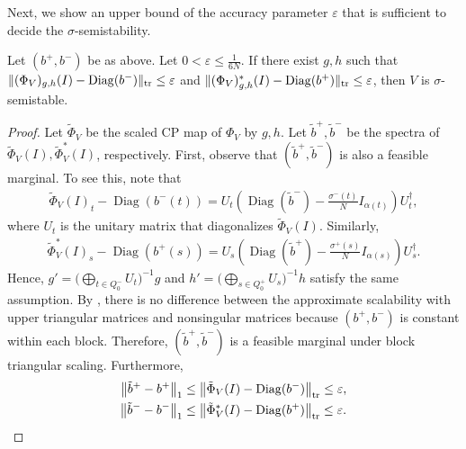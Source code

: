 \documentclass[a4paper,11pt]{article}
\numberwithin{equation}{section}
\newcommand{\eps}{\varepsilon}
\DeclareMathOperator{\tr}{tr}
\DeclareMathOperator{\Diag}{Diag}
\DeclarePairedDelimiter{\norm}{\lVert}{\rVert}
\begin{document}
Next, we show an upper bound of the accuracy parameter $\eps$ that is sufficient to decide the $\sigma$-semistability.

\begin{lemma}\label{lem:scaling-ss-eps}
    Let $(b^+, b^-)$ be as above.
    Let 
    $
    0 < \eps \leq \frac{1}{6N}.
    $
    If there exist $g, h$ such that $\norm{(\Phi_V)_{g,h}(I) - \Diag(b^-)}_{\tr} \leq \eps$ and $\norm{(\Phi_V)_{g,h}^*(I) - \Diag(b^+)}_{\tr} \leq \eps$, then $V$ is $\sigma$-semistable.
\end{lemma}
\begin{proof}
    Let $\tilde \Phi_V$ be the scaled CP map of $\Phi_V$ by $g, h$.
    Let $\tilde b^+, \tilde b^-$ be the spectra of $\tilde \Phi_V(I), \tilde \Phi_V^*(I)$, respectively.
    First, observe that $(\tilde b^+, \tilde b^-)$ is also a feasible marginal.
    To see this, note that
    \begin{align}
        \tilde\Phi_V(I)_t - \Diag(b^-(t)) = U_t \left(\Diag(\tilde b^-) - \frac{\sigma^-(t)}{N} I_{\alpha(t)}\right) U_t^\dagger, 
    \end{align}
    where $U_t$ is the unitary matrix that diagonalizes $\tilde \Phi_V(I)$.
    Similarly, 
    \begin{align}
        \tilde\Phi_V^*(I)_s - \Diag(b^+(s)) = U_s\left(\Diag(\tilde b^+) - \frac{\sigma^+(s)}{N} I_{\alpha(s)}\right) U_s^\dagger. 
    \end{align}
    Hence, $g' = {\bigl(\bigoplus_{t \in Q_0^-} U_t\bigr)}^{-1} g$ and $h' = {\bigl( \bigoplus_{s \in Q_0^+} U_s\bigr)}^{-1} h$ satisfy the same assumption.
    By , there is no difference between the approximate scalability with upper triangular matrices and nonsingular matrices because $(b^+, b^-)$ is constant within each block.
    Therefore, $(\tilde b^+, \tilde b^-)$ is a feasible marginal under block triangular scaling.
    Furthermore, 
    \begin{align}
    \norm[\big]{\tilde b^+ - b^+}_1 &\leq \norm[\big]{\tilde\Phi_V(I) - \Diag(b^-)}_{\tr}   \leq \eps, \\
    \norm[\big]{\tilde b^- - b^-}_1 &\leq \norm[\big]{\tilde\Phi^*_V(I) - \Diag(b^+)}_{\tr} \leq \eps.
    \end{align}


\end{proof}
\end{document}
